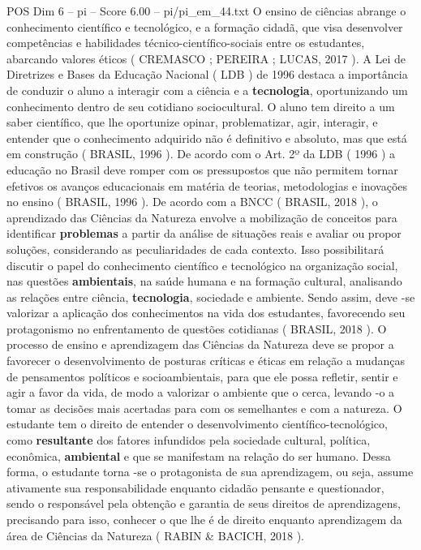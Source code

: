\begin{textsample}{POS Dim 6 – pi – Score 6.00 – pi/pi\_em\_44.txt}
O ensino de ciências abrange o conhecimento científico e tecnológico, e a formação cidadã, que visa desenvolver competências e habilidades técnico-científico-sociais entre os estudantes, abarcando valores éticos ( CREMASCO ; PEREIRA ; LUCAS, 2017 ).
A Lei de Diretrizes e Bases da Educação Nacional ( LDB ) de 1996 destaca a importância de conduzir o aluno a interagir com a ciência e a \textbf{tecnologia}, oportunizando um conhecimento dentro de seu cotidiano sociocultural.
O aluno tem direito a um saber científico, que lhe oportunize opinar, problematizar, agir, interagir, e entender que o conhecimento adquirido não é definitivo e absoluto, mas que está em construção ( BRASIL, 1996 ).
De acordo com o Art. 2º da LDB ( 1996 ) a educação no Brasil deve romper com os pressupostos que não permitem tornar efetivos os avanços educacionais em matéria de teorias, metodologias e inovações no ensino ( BRASIL, 1996 ).
De acordo com a BNCC ( BRASIL, 2018 ), o aprendizado das Ciências da Natureza envolve a mobilização de conceitos para identificar \textbf{problemas} a partir da análise de situações reais e avaliar ou propor soluções, considerando as peculiaridades de cada contexto.
Isso possibilitará discutir o papel do conhecimento científico e tecnológico na organização social, nas questões \textbf{ambientais}, na saúde humana e na formação cultural, analisando as relações entre ciência, \textbf{tecnologia}, sociedade e ambiente.
Sendo assim, deve -se valorizar a aplicação dos conhecimentos na vida dos estudantes, favorecendo seu protagonismo no enfrentamento de questões cotidianas ( BRASIL, 2018 ).
O processo de ensino e aprendizagem das Ciências da Natureza deve se propor a favorecer o desenvolvimento de posturas críticas e éticas em relação a mudanças de pensamentos políticos e socioambientais, para que ele possa refletir, sentir e agir a favor da vida, de modo a valorizar o ambiente que o cerca, levando -o a tomar as decisões mais acertadas para com os semelhantes e com a natureza.
O estudante tem o direito de entender o desenvolvimento científico-tecnológico, como \textbf{resultante} dos fatores infundidos pela sociedade cultural, política, econômica, \textbf{ambiental} e que se manifestam na relação do ser humano.
Dessa forma, o estudante torna -se o protagonista de sua aprendizagem, ou seja, assume ativamente sua responsabilidade enquanto cidadão pensante e questionador, sendo o responsável pela obtenção e garantia de seus direitos de aprendizagens, precisando para isso, conhecer o que lhe é de direito enquanto aprendizagem da área de Ciências da Natureza ( RABIN \& BACICH, 2018 ).

\end{textsample}

